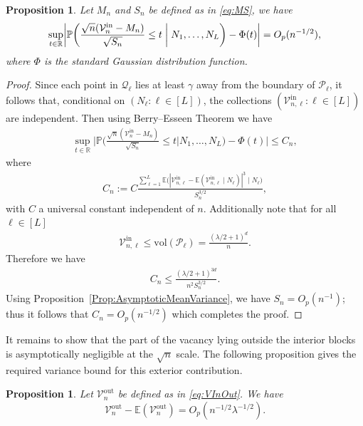 \documentclass[11pt]{article}
\newtheorem{prop}[thm]{Proposition}
\newcommand{\E}{\mathbb{E}}
\newcommand{\vol}{\mathrm{vol}}
\newcommand{\abs}[1]{| #1|}
\begin{document}
\begin{prop}
\label{Prop:ConditionalBerryEsseen}
    Let $M_n$ and $S_n$ be defined as in \eqref{eq:MS}, we have 
    \[  
    \sup_{t\in\mathbb{R}} \biggl|\mathbb{P}\biggl(\frac{\sqrt{n}(\mathcal{V}_n^{\mathrm{in}} - M_n)}{\sqrt{S_n}} \leq t\biggm| N_1,\ldots,N_L\biggr) - \Phi(t)\biggr| = O_p(n^{-1/2}),
    \]
    where $\Phi$ is the standard Gaussian distribution function.
\end{prop}

\begin{proof}
Since each point in $\mathcal{Q}_\ell$ lies at least $\gamma$ away from the boundary of $\mathcal{P}_\ell$, it follows that, conditional on $(N_\ell : \ell \in [L])$, the collections $(\mathcal{V}_{n, \ell}^{\mathrm{in}} : \ell \in [L])$ are independent. Then using Berry--Esseen Theorem \citep{berry1941accuracy, esseen1942liapunov} we have
\begin{align*}
    \sup_{t\in\mathbb{R}}\Big|\mathbb{P}\bigg(\frac{\sqrt{n}(\mathcal{V}_n^{\mathrm{in}} - M_n)}{\sqrt{S_n}}\leq t\bigg | N_1, \ldots, N_L\bigg) - \Phi(t)\Big| \leq C_n,
\end{align*}
where 
\begin{align*}
    C_n := C\frac{\sum_{\ell = 1}^L\E\big(\abs{\mathcal{V}_{n, \ell}^{\mathrm{in}} - \E(\mathcal{V}_{n, \ell}^{\mathrm{in}}\mid N_\ell)}^3\mid N_\ell\big)}{S_n^{3/2}},
\end{align*}
with $C$ a universal constant independent of $n$. Additionally note that for all $\ell\in[L]$
\begin{align*}
    \mathcal{V}_{n, \ell}^{\mathrm{in}} \leq \vol(\mathcal{P}_\ell) = \frac{(\lambda/2 + 1)^d}{n}.
\end{align*}
Therefore we have
\begin{align*}
    C_n\leq \frac{(\lambda/2 + 1)^{3d}}{n^2S_n^{3/2}}.
\end{align*}
Using Proposition~\ref{Prop:AsymptoticMeanVariance}, we have $S_n = O_p(n^{-1})$; thus it follows that $C_n = O_p(n^{-1/2})$ which completes the proof.
\end{proof}

It remains to show that the part of the vacancy lying outside the interior blocks is asymptotically negligible at the $\sqrt n$ scale. The following proposition gives the required variance bound for this exterior contribution.

\begin{prop}\label{Prop:VoutContribution}
    Let $\mathcal{V}_n^{\mathrm{out}}$ be defined as in \eqref{eq:VInOut}. We have 
    \[
    \mathcal{V}_n^{\mathrm{out}} - \mathbb{E}(\mathcal{V}_n^{\mathrm{out}}) = O_p(n^{-1/2}\lambda^{-1/2}).
    \]
\end{prop}
\end{document}
